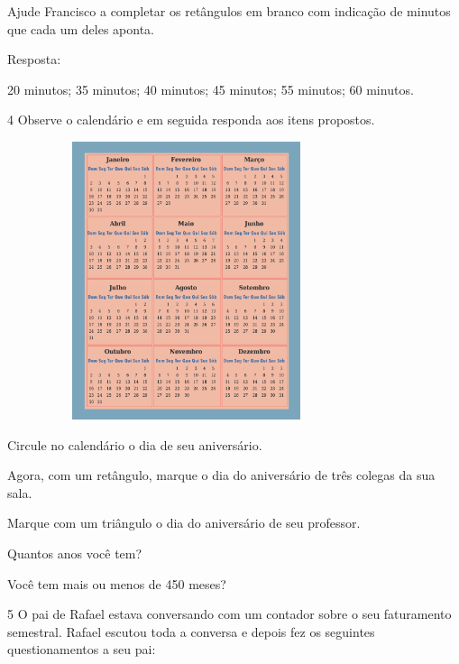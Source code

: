 Ajude Francisco a completar os retângulos em branco com indicação de
minutos que cada um deles aponta.

Resposta:

20 minutos; 35 minutos; 40 minutos; 45 minutos; 55 minutos; 60 minutos.

\num{4} Observe o calendário e em seguida responda aos itens propostos.


\includegraphics[width=4.13369in,height=3.20861in]{media/image54.png}

\begin{escolha}
\item
  Circule no calendário o dia de seu aniversário.

\item
  Agora, com um retângulo, marque o dia do aniversário de três colegas da sua sala.

\item
  Marque com um triângulo o dia do aniversário de seu professor.

\item
  Quantos anos você tem?

\item
  Você tem mais ou menos de 450 meses?
\end{escolha}

\num{5} O pai de Rafael estava conversando com um contador sobre o seu
faturamento semestral. Rafael escutou toda a conversa e depois fez os
seguintes questionamentos a seu pai:

